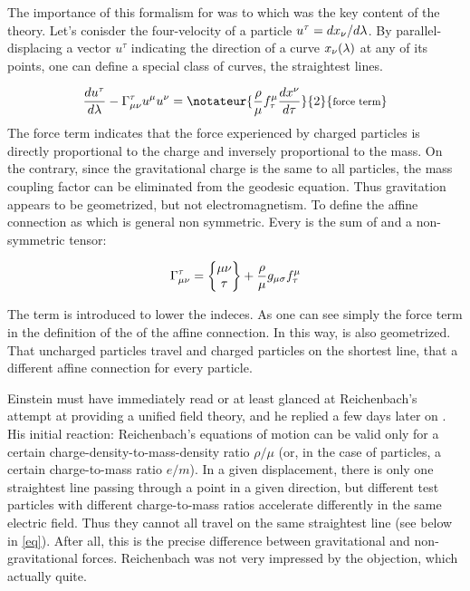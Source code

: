 \documentclass[draft]{article}
\newcommand{\ap}{\ensuremath{\lambda}\xspace}
\begin{document}
The importance of this formalism for \gr was to which was the key content of the theory. Let's conisder the four-velocity of a particle $u^\tau=d\xn/d\ap$. By parallel-displacing a vector $u^\tau$ indicating the direction of a curve $\xn(\ap)$ at any of its points, one can define a special class of curves, the straightest lines. 

\begin{equation*}
\frac{d {u^\tau}}{d\ap} - \Gtmn u^{\mu} u^\nu = \notateur{\frac{\rho}{\mu} f_{\tau}^{\mu} \frac{d x^{\nu}}{d \tau}}{2}{\texts{force term}}
\end{equation*}
%
The force term indicates that the force experienced by charged particles is directly proportional to the charge and inversely proportional to the mass. On the contrary, since the gravitational charge is the same to all particles, the mass coupling factor can be eliminated from the geodesic equation. Thus gravitation appears to be geometrized, but not electromagnetism. To define the affine connection as which is general non symmetric. Every is the sum of and a non-symmetric tensor:

  
\begin{equation*}
\Gamma^\tau_{\mu\nu} = \begin{Bmatrix} \mu \nu \\ \tau \end{Bmatrix} + \frac{\rho}{\mu} g_{\mu\sigma} f_{\tau}^{\mu} 
\end{equation*}

The term is introduced to lower the indeces. As one can see simply the force term in the definition of the of the affine connection. In this way, is also geometrized. That uncharged particles travel and charged particles on the shortest line, that a different affine connection for every particle. 


Einstein must have immediately read or at least glanced at Reichenbach's attempt at providing a unified field theory, and he replied a few days later on . His initial reaction: Reichenbach's equations of motion can be valid only for a certain charge-density-to-mass-density ratio $\rho/\mu$ (or, in the case of particles, a certain charge-to-mass ratio $e/m$). In a given displacement, there is only one straightest line passing through a point in a given direction, but different test particles with different charge-to-mass ratios accelerate differently in the same electric field. Thus they cannot all travel on the same straightest line (see below in \cref{eq}). After all, this is the precise difference between gravitational and non-gravitational forces. Reichenbach was not very impressed by the objection, which actually quite. 
\end{document}
